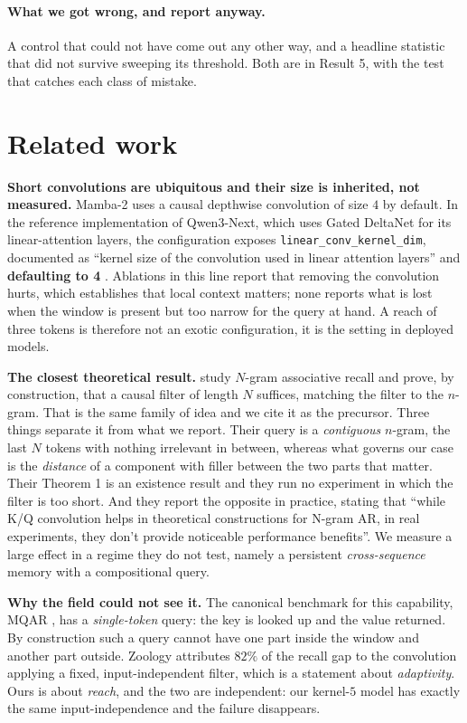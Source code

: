\documentclass[11pt,a4paper]{article}
\begin{document}
\paragraph{What we got wrong, and report anyway.} A control that could not have come out any other
way, and a headline statistic that did not survive sweeping its threshold. Both are in Result 5, with
the test that catches each class of mistake.

\section{Related work}

\textbf{Short convolutions are ubiquitous and their size is inherited, not measured.} Mamba-2
\citep{mamba2} uses a causal depthwise convolution of size $4$ by default. In the reference
implementation of Qwen3-Next, which uses Gated DeltaNet \citep{gateddeltanet} for its linear-attention
layers, the configuration exposes \texttt{linear\_conv\_kernel\_dim}, documented as ``kernel size of the
convolution used in linear attention layers'' and \textbf{defaulting to 4} \citep{qwen3next}. Ablations
in this line report that removing the convolution hurts, which establishes that local context matters;
none reports what is lost when the window is present but too narrow for the query at hand. A reach of
three tokens is therefore not an exotic configuration, it is the setting in deployed models.

\textbf{The closest theoretical result.} \citet{cat} study $N$-gram associative recall and prove, by
construction, that a causal filter of length $N$ suffices, matching the filter to the $n$-gram. That is
the same family of idea and we cite it as the precursor. Three things separate it from what we report.
Their query is a \emph{contiguous} $n$-gram, the last $N$ tokens with nothing irrelevant in between,
whereas what governs our case is the \emph{distance} of a component with filler between the two parts
that matter. Their Theorem 1 is an existence result and they run no experiment in which the filter is
too short. And they report the opposite in practice, stating that ``while K/Q convolution helps in
theoretical constructions for N-gram AR, in real experiments, they don't provide noticeable performance
benefits''. We measure a large effect in a regime they do not test, namely a persistent
\emph{cross-sequence} memory with a compositional query.

\textbf{Why the field could not see it.} The canonical benchmark for this capability, MQAR
\citep{zoology}, has a \emph{single-token} query: the key is looked up and the value returned. By
construction such a query cannot have one part inside the window and another part outside. Zoology
attributes $82\%$ of the recall gap to the convolution applying a fixed, input-independent filter, which
is a statement about \emph{adaptivity}. Ours is about \emph{reach}, and the two are independent: our
kernel-$5$ model has exactly the same input-independence and the failure disappears.
\end{document}
